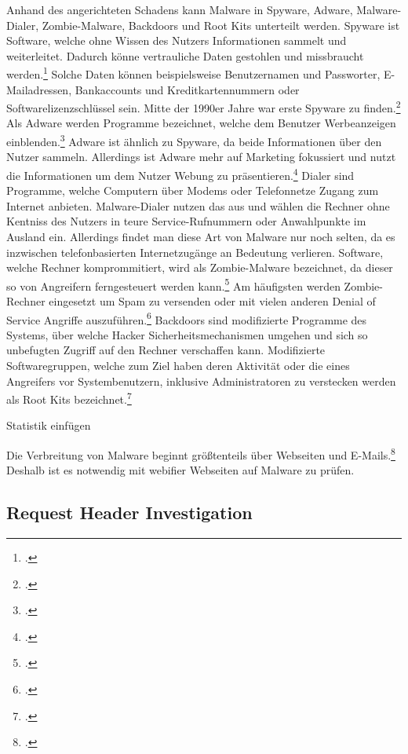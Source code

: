 Anhand des angerichteten Schadens kann Malware in Spyware, Adware, Malware-Dialer, Zombie-Malware, Backdoors und Root Kits unterteilt werden. Spyware ist Software, welche ohne Wissen des Nutzers Informationen sammelt und weiterleitet. Dadurch könne vertrauliche Daten gestohlen und missbraucht werden.\footcite[Vgl.][95\psq]{netzwerkDatensicherheit} Solche Daten können beispielsweise Benutzernamen und Passworter, E-Mailadressen, Bankaccounts und Kreditkartennummern oder Softwarelizenzschlüssel sein. Mitte der 1990er Jahre war erste Spyware zu finden.\footcite[Vgl.][16]{virusesMalware} Als Adware werden Programme bezeichnet, welche dem Benutzer Werbeanzeigen einblenden.\footcite[Vgl.][96]{netzwerkDatensicherheit} Adware ist ähnlich zu Spyware, da beide Informationen über den Nutzer sammeln. Allerdings ist Adware mehr auf Marketing fokussiert und nutzt die Informationen um dem Nutzer Webung zu präsentieren.\footcite[Vgl.][17]{virusesMalware} Dialer sind Programme, welche Computern über Modems oder Telefonnetze Zugang zum Internet anbieten. Malware-Dialer nutzen das aus und wählen die Rechner ohne Kentniss des Nutzers in teure Service-Rufnummern oder Anwahlpunkte im Ausland ein. Allerdings findet man diese Art von Malware nur noch selten, da es inzwischen telefonbasierten Internetzugänge an Bedeutung verlieren. Software, welche Rechner komprommitiert, wird als Zombie-Malware bezeichnet, da dieser so von Angreifern ferngesteuert werden kann.\footcite[Vgl.][96]{netzwerkDatensicherheit} Am häufigsten werden Zombie-Rechner eingesetzt um Spam zu versenden oder mit vielen anderen Denial of Service Angriffe auszuführen.\footcite[Vgl.][18]{virusesMalware} Backdoors sind modifizierte Programme des Systems, über welche Hacker Sicherheitsmechanismen umgehen und sich so unbefugten Zugriff auf den Rechner verschaffen kann. Modifizierte Softwaregruppen, welche zum Ziel haben deren Aktivität oder die eines Angreifers vor Systembenutzern, inklusive Administratoren zu verstecken werden als Root Kits bezeichnet.\footcite[Vgl.][96]{netzwerkDatensicherheit}

\todo Statistik einfügen

Die Verbreitung von Malware beginnt größtenteils über Webseiten und E-Mails.\footcite[Vgl.][97]{netzwerkDatensicherheit} Deshalb ist es notwendig mit webifier Webseiten auf Malware zu prüfen.

\subsection{Request Header Investigation}

